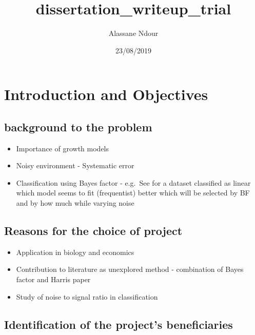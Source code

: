 \documentclass[]{article}
\title{dissertation\_writeup\_trial}
\author{Alassane Ndour}
\date{23/08/2019}
\providecommand{\tightlist}{%
  \setlength{\itemsep}{0pt}\setlength{\parskip}{0pt}}
\begin{document}
\maketitle

\hypertarget{introduction-and-objectives}{%
\section{Introduction and
Objectives}\label{introduction-and-objectives}}

\hypertarget{background-to-the-problem}{%
\subsection{background to the problem}\label{background-to-the-problem}}

\begin{itemize}
\tightlist
\item
  Importance of growth models
\item
  Noisy environment - Systematic error
\item
  Classification using Bayes factor - e.g.~See for a dataset classified
  as linear which model seems to fit (frequentist) better which will be
  selected by BF and by how much while varying noise
\end{itemize}

\hypertarget{reasons-for-the-choice-of-project}{%
\subsection{Reasons for the choice of
project}\label{reasons-for-the-choice-of-project}}

\begin{itemize}
\tightlist
\item
  Application in biology and economics
\item
  Contribution to literature as unexplored method - combination of Bayes
  factor and Harris paper
\item
  Study of noise to signal ratio in classification
\end{itemize}

\hypertarget{identification-of-the-projects-beneficiaries}{%
\subsection{Identification of the project's
beneficiaries}\label{identification-of-the-projects-beneficiaries}}
\end{document}
